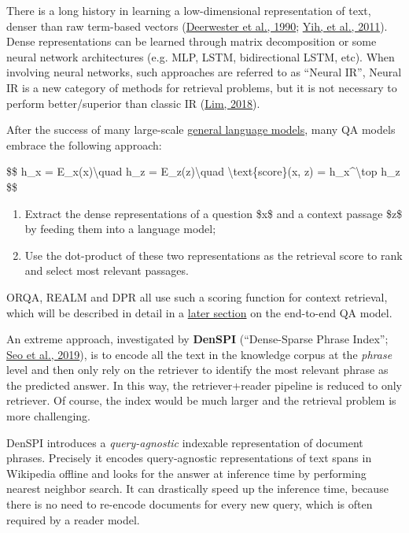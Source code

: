 There is a long history in learning a low-dimensional representation of text, denser than raw term-based vectors (\href{http://lsa.colorado.edu/papers/JASIS.lsi.90.pdf}{Deerwester et al., 1990}; \href{https://www.aclweb.org/anthology/W11-0329/}{Yih, et al., 2011}). Dense representations can be learned through matrix decomposition or some neural network architectures (e.g. MLP, LSTM, bidirectional LSTM, etc). When involving neural networks, such approaches are referred to as ``Neural IR'', Neural IR is a new category of methods for retrieval problems, but it is not necessary to perform better/superior than classic IR (\href{https://sigir.org/wp-content/uploads/2019/01/p040.pdf}{Lim, 2018}).

After the success of many large-scale \href{https://lilianweng.github.io/posts/2019-01-31-lm/}{general language models}, many QA models embrace the following approach:

\$\$ h\_x = E\_x(x)\textbackslash quad h\_z = E\_z(z)\textbackslash quad \textbackslash text\{score\}(x, z) = h\_x\^{}\textbackslash top h\_z \$\$

\begin{enumerate}
\tightlist
\item
  Extract the dense representations of a question \$x\$ and a context passage \$z\$ by feeding them into a language model;
\item
  Use the dot-product of these two representations as the retrieval score to rank and select most relevant passages.
\end{enumerate}

ORQA, REALM and DPR all use such a scoring function for context retrieval, which will be described in detail in a \hyperref[end-to-end-joint-training]{later section} on the end-to-end QA model.

An extreme approach, investigated by \textbf{DenSPI} (``Dense-Sparse Phrase Index''; \href{https://arxiv.org/abs/1906.05807}{Seo et al., 2019}), is to encode all the text in the knowledge corpus at the \emph{phrase} level and then only rely on the retriever to identify the most relevant phrase as the predicted answer. In this way, the retriever+reader pipeline is reduced to only retriever. Of course, the index would be much larger and the retrieval problem is more challenging.

DenSPI introduces a \emph{query-agnostic} indexable representation of document phrases. Precisely it encodes query-agnostic representations of text spans in Wikipedia offline and looks for the answer at inference time by performing nearest neighbor search. It can drastically speed up the inference time, because there is no need to re-encode documents for every new query, which is often required by a reader model.

